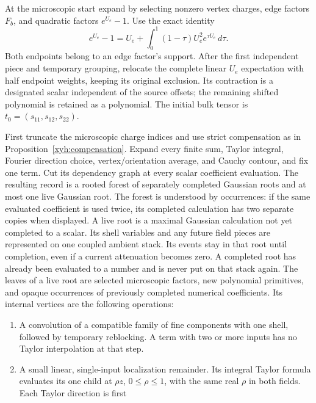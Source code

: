 At the microscopic start expand by selecting nonzero vertex charges,
edge factors $F_b$, and quadratic factors $e^{U_e}-1$. Use the exact identity
\begin{equation}\label{xyh:quadratic-remainder}
 e^{U_e}-1=U_e+\int_0^1(1-\tau)U_e^2e^{\tau U_e}\,d\tau.
\end{equation}
Both endpoints belong to an edge factor's support. After the first
independent piece and temporary grouping, relocate the complete linear
$U_e$ expectation with half endpoint weights, keeping its original
exclusion. Its contraction is a designated scalar independent of the
source offsets; the remaining shifted polynomial is retained as a
polynomial. The initial bulk tensor is
$t_0=(s_{11},s_{12},s_{22})$.

\begin{definition}\label{xyh:history-definition}
First truncate the microscopic charge indices and use strict compensation
as in Proposition~\ref{xyh:compensation}. Expand every finite sum,
Taylor integral, Fourier direction choice, vertex/orientation average,
and Cauchy contour, and fix one term. Cut its dependency graph at every
scalar coefficient evaluation. The resulting record is a rooted forest
of separately completed Gaussian roots and at most one live Gaussian
root. The forest is understood by occurrences: if the same evaluated
coefficient is used twice, its completed calculation has two separate
copies when displayed. A live root is a maximal Gaussian calculation not
yet completed to a scalar. Its shell variables and any future field pieces
are represented on one coupled ambient stack. Its events stay in that root
until completion, even if a current attenuation becomes zero. A completed
root has already been evaluated to a number and is never put
on that stack again. The leaves of a live root are selected microscopic
factors, new polynomial primitives, and opaque occurrences of previously
completed numerical coefficients. Its internal vertices are the following
operations:
\begin{enumerate}[label=\textup{(\roman*)}]
\item A convolution of a compatible family of fine components with one
shell, followed by temporary reblocking. A term with two or more inputs
has no Taylor interpolation at that step.
\item A small linear, single-input localization remainder. Its integral
Taylor formula evaluates its one child at $\rho z$, $0\le\rho\le1$,
with the same real $\rho$ in both fields. Each Taylor direction is first

\end{enumerate}
\end{definition}
